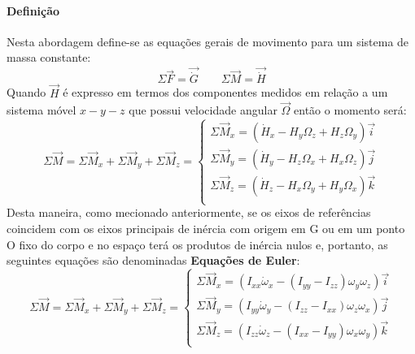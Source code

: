 \documentclass{article}
\begin{document}
            \paragraph{Definição}Nesta abordagem define-se as equações gerais de movimento para um sistema de massa constante:
                \begin{equation}
                    \boxed{
                        \Sigma\vec{F} = \vec{\dot{G}}
                    }
                    \qquad
                    \boxed{
                        \Sigma\vec{M} = \vec{\dot{H}}
                    }
                \end{equation}
            Quando $\vec{H}$ é expresso em termos dos componentes medidos em relação a um sistema móvel $x-y-z$ que possui velocidade angular $\vec{\Omega}$ então o momento será:
                \begin{equation}
                    \boxed{
                        \Sigma\vec{M} = 
                        \Sigma\vec{M}_{x} + 
                        \Sigma\vec{M}_{y} + 
                        \Sigma\vec{M}_{z} = 
                        \begin{cases}
                            \Sigma\vec{M}_{x} = (\dot{H}_{x} - H_{y}\Omega_{z} + H_{z}\Omega_{y})\vec{i}\\
                            \Sigma\vec{M}_{y} = (\dot{H}_{y} - H_{z}\Omega_{x} + H_{x}\Omega_{z})\vec{j}\\
                            \Sigma\vec{M}_{z} = (\dot{H}_{z} - H_{x}\Omega_{y} + H_{y}\Omega_{x})\vec{k}\\
                        \end{cases}
                    }
                \end{equation}
            Desta maneira, como mecionado anteriormente, se os eixos de referências coincidem com os eixos principais de inércia com origem em G ou em um ponto O fixo do corpo e no espaço terá os produtos de inércia nulos e, portanto, as seguintes equações são denominadas \textbf{Equações de Euler}:
                \begin{equation}
                    \boxed{
                        \Sigma\vec{M} = 
                        \Sigma\vec{M}_{x} + 
                        \Sigma\vec{M}_{y} + 
                        \Sigma\vec{M}_{z} = 
                        \begin{cases}
                            \Sigma\vec{M}_{x} = (I_{xx}\dot{\omega}_{x} - (I_{yy} - I_{zz})\omega_{y}\omega_{z})\vec{i}\\
                            \Sigma\vec{M}_{y} = (I_{yy}\dot{\omega}_{y} - (I_{zz} - I_{xx})\omega_{z}\omega_{x})\vec{j}\\
                            \Sigma\vec{M}_{z} = (I_{zz}\dot{\omega}_{z} - (I_{xx} - I_{yy})\omega_{x}\omega_{y})\vec{k}\\
                        \end{cases}
                    }
                \end{equation}
\newpage
\end{document}
